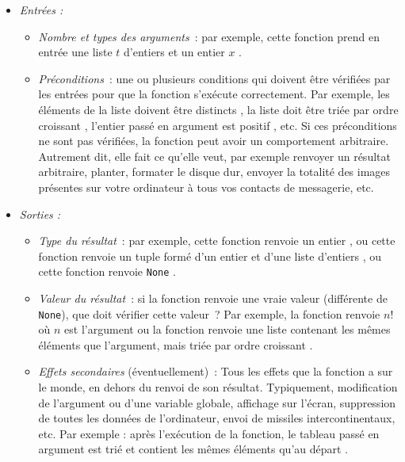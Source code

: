 \documentclass{magnolia}
\begin{document}
\begin{itemize}
  \item \emph{Entrées :}
  \begin{itemize}
    \item \emph{Nombre et types des arguments}~: par exemple, \og cette fonction prend
          en entrée une liste $t$ d'entiers et un entier $x$ \fg.
    \item \emph{Préconditions}~: une ou plusieurs conditions qui doivent
    être vérifiées par les entrées pour que la fonction s'exécute correctement.
    Par exemple, \og les éléments de la liste doivent être distincts \fg,
          \og la liste doit être triée par ordre croissant \fg,
          \og l'entier passé en argument est positif \fg, etc.
    Si ces préconditions ne sont pas vérifiées, la fonction peut avoir un comportement
    arbitraire. Autrement dit, elle fait ce qu'elle veut, par exemple
    renvoyer un résultat arbitraire, planter, formater le disque dur,
      envoyer la totalité des images présentes sur votre ordinateur à tous vos
      contacts de messagerie, etc.
  \end{itemize}
  \item \emph{Sorties :}
  \begin{itemize}
    \item \emph{Type du résultat}~: par exemple, \og cette fonction renvoie un entier \fg,
    ou \og cette fonction renvoie un tuple formé d'un entier et d'une liste d'entiers \fg, ou
    \og cette fonction renvoie \verb!None! \fg.
    \item \emph{Valeur du résultat}~: si la fonction renvoie une \og vraie \fg valeur
          (différente de \verb!None!), que doit vérifier cette valeur~?
          Par exemple, \og la fonction renvoie $n!$ où $n$ est l'argument \fg ou
          \og la fonction renvoie une liste contenant les mêmes éléments que
          l'argument, mais triée par ordre croissant \fg.
    \item \emph{Effets secondaires} (éventuellement)~: Tous les effets que la fonction
    a sur le monde, en dehors du renvoi de son résultat. Typiquement, modification
          de l'argument ou d'une variable globale, affichage sur l'écran, suppression de toutes
          les données de l'ordinateur, envoi de missiles intercontinentaux, etc.
          Par exemple : \og après l'exécution de la fonction, le tableau passé en
          argument est trié et contient les mêmes éléments qu'au départ \fg.
  \end{itemize}
\end{itemize}
\end{document}
